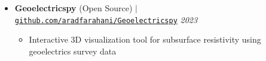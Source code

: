 \documentclass[letterpaper,11pt]{article}
\begin{document}
		\vspace{-1.2em}
		\begin{itemize}[left=0pt, label={}, topsep=7.5pt, partopsep=0pt, itemsep=6pt, parsep=0pt]
			\item \textbf{Geoelectricspy} (Open Source) $|$ \normalfont\href{https://github.com/aradfarahani/Geoelectricspy/}{\texttt{github.com/aradfarahani/Geoelectricspy}} \hfill \textit{2023}
			\begin{itemize}[left=15pt, label=\textbullet, topsep=4pt, partopsep=0pt, itemsep=3pt, parsep=0pt]
				\item Interactive 3D visualization tool for subsurface resistivity using geoelectrics survey data
			\end{itemize}
		\end{itemize}
		\vspace{-2.7em}
\end{document}
